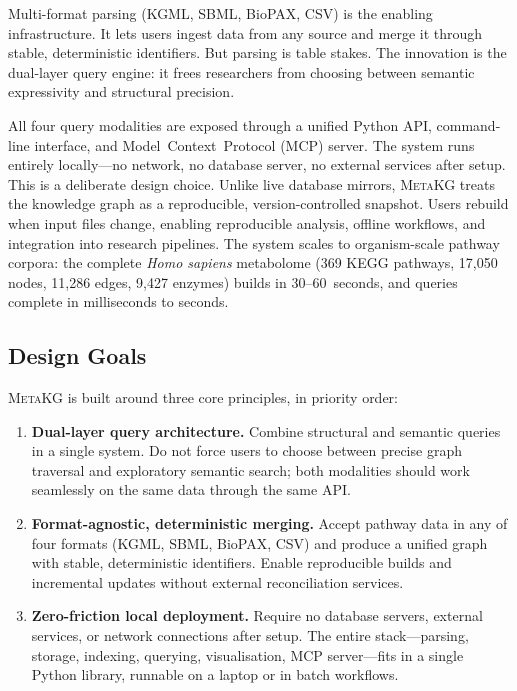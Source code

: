 \documentclass[10pt]{article}
\begin{document}
Multi-format parsing (KGML, SBML, BioPAX, CSV) is the enabling
infrastructure. It lets users ingest data from any source and merge it through
stable, deterministic identifiers. But parsing is table stakes. The innovation
is the dual-layer query engine: it frees researchers from choosing between
semantic expressivity and structural precision.

All four query modalities are exposed through a unified Python API,
command-line interface, and Model~Context~Protocol (MCP) server. The system
runs entirely locally---no network, no database server, no external services
after setup. This is a deliberate design choice. Unlike live database mirrors,
\textsc{MetaKG} treats the knowledge graph as a reproducible,
version-controlled snapshot. Users rebuild when input files change, enabling
reproducible analysis, offline workflows, and integration into research
pipelines. The system scales to organism-scale pathway corpora: the complete
\textit{Homo sapiens} metabolome (369 KEGG pathways, 17,050 nodes, 11,286
edges, 9,427 enzymes) builds in 30--60~seconds, and queries complete in
milliseconds to seconds.

\subsection{Design Goals}

\textsc{MetaKG} is built around three core principles, in priority order:

\begin{enumerate}[leftmargin=*, itemsep=2pt]
\item \textbf{Dual-layer query architecture.} Combine structural and semantic
  queries in a single system. Do not force users to choose between precise
  graph traversal and exploratory semantic search; both modalities should work
  seamlessly on the same data through the same API.

\item \textbf{Format-agnostic, deterministic merging.} Accept pathway data in
  any of four formats (KGML, SBML, BioPAX, CSV) and produce a unified graph
  with stable, deterministic identifiers. Enable reproducible builds and
  incremental updates without external reconciliation services.

\item \textbf{Zero-friction local deployment.} Require no database servers,
  external services, or network connections after setup. The entire
  stack---parsing, storage, indexing, querying, visualisation, MCP
  server---fits in a single Python library, runnable on a laptop or in batch
  workflows.
\end{enumerate}
\end{document}
